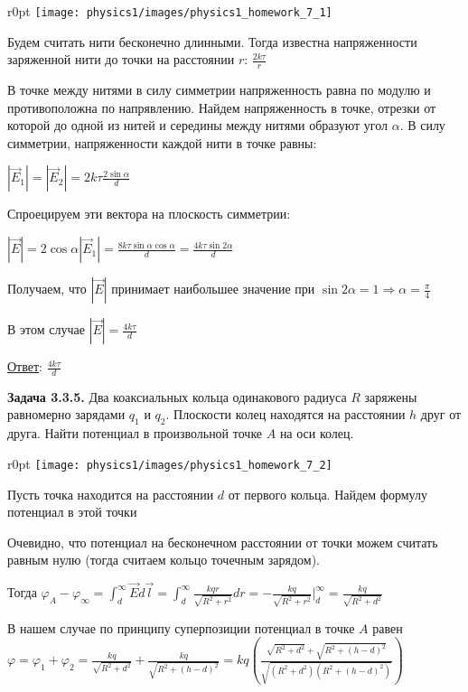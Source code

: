 \documentclass[12pt]{article}
\begin{document}
\begin{minipage}{\textwidth}
    \begin{wrapfigure}{r}{0pt}
        \texttt{[image: physics1/images/physics1\_homework\_7\_1]}
    \end{wrapfigure}

    Будем считать нити бесконечно длинными. Тогда известна напряженности заряженной нити до точки на расстоянии $r$: $\frac{2k\tau}{r}$

    В точке между нитями в силу симметрии напряженность равна по модулю и противоположна по напрявлению. Найдем напряженность в точке,
    отрезки от которой до одной из нитей и середины между нитями образуют угол $\alpha$. В силу симметрии, напряженности
    каждой нити в точке равны:

    $|\vec{E}_1| = |\vec{E}_2| = 2k\tau \frac{2\sin\alpha}{d}$

    Спроецируем эти вектора на плоскость симметрии:

    $|\vec{E}| = 2\cos\alpha |\vec{E}_1| = \frac{8k\tau \sin\alpha\cos\alpha}{d} = \frac{4k\tau \sin2\alpha}{d}$

    Получаем, что $|\vec{E}|$ принимает наибольшее значение при $\sin2\alpha = 1 \Longrightarrow \alpha = \frac{\pi}{4}$

    В этом случае $|\vec{E}| = \frac{4k\tau}{d}$
\end{minipage}

\bigvspace

\underline{Ответ}: $\frac{4k\tau}{d}$


\clearpage

\begin{tcolorbox}
    \textbf{Задача 3.3.5.} Два коаксиальных кольца одинакового радиуса $R$
    заряжены равномерно зарядами $q_1$ и $q_2$. Плоскости колец находятся
    на расстоянии $h$ друг от друга. Найти потенциал в произвольной
    точке $A$ на оси колец.
\end{tcolorbox}

\begin{minipage}{\textwidth}
    \begin{wrapfigure}{r}{0pt}
        \texttt{[image: physics1/images/physics1\_homework\_7\_2]}
    \end{wrapfigure}

    Пусть точка находится на расстоянии $d$ от первого кольца. Найдем формулу потенциал в этой точки

    Очевидно, что потенциал на бесконечном расстоянии от точки можем считать равным нулю (тогда считаем кольцо точечным зарядом). 

    Тогда $\varphi_A - \varphi_\infty = \int_{d}^{\infty} \vec{E}d\vec{l} = \int_{d}^{\infty} \frac{kqr}{\sqrt{R^2 + r^2}} dr = 
    -\frac{kq}{\sqrt{R^2 + r^2}} \Big|_{d}^{\infty} = \frac{kq}{\sqrt{R^2 + d^2}}$

    В нашем случае по принципу суперпозиции потенциал в точке $A$ равен $\varphi = \varphi_1 + \varphi_2 = 
    \frac{kq}{\sqrt{R^2 + d^2}} + \frac{kq}{\sqrt{R^2 + (h - d)^2}} = 
    kq\left(\frac{\sqrt{R^2 + d^2} + \sqrt{R^2 + (h - d)^2}}{\sqrt{(R^2 + d^2)(R^2 + (h - d)^2)}}\right)$
\end{minipage}
\end{document}

